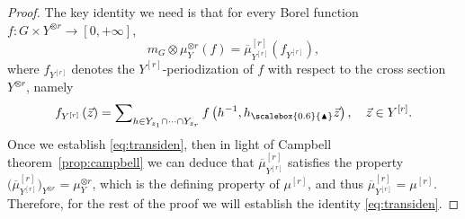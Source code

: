 \documentclass{amsart}
\numberwithin{equation}{subsection}
\theoremstyle{remark}
\newcommand{\diag}{\textsubscript{\raisebox{0.4ex}{\scalebox{0.6}{\(\blacktriangle\)}}}}\xspace
\begin{document}
\begin{proof}
The key identity we need is that for every Borel function \(f:G\times Y^{\otimes r}\to\left[0,+\infty\right]\),
\begin{equation}\label{eq:transiden}
m_{G}\otimes\mu_{Y}^{\otimes r}\left(f\right)=\overline{\mu}_{Y^{\left[r\right]}}^{\left[r\right]}\left(f_{Y^{\left[r\right]}}\right),
\end{equation}
where \(f_{Y^{\left[r\right]}}\) denotes the \(Y^{\left[r\right]}\)-periodization of \(f\) with respect to the cross section \(Y^{\otimes r}\), namely
\[f_{Y^{\left[r\right]}}\left(\vec{z}\right)=\sum\nolimits_{h\in Y_{z_{1}}\cap\dotsm\cap Y_{z_{r}}}f\left(h^{-1},h\diag\vec{z}\right),\quad\vec{z}\in Y^{\left[r\right]}.\]
Once we establish \eqref{eq:transiden}, then in light of Campbell theorem~\ref{prop:campbell} we can deduce that \(\overline{\mu}_{Y^{\left[r\right]}}^{\left[r\right]}\) satisfies the property \(\big(\overline{\mu}_{Y^{\left[r\right]}}^{\left[r\right]}\big)_{Y^{\otimes r}}=\mu_{Y}^{\otimes r}\), which is the defining property of \(\mu^{\left[r\right]}\), and thus \(\overline{\mu}_{Y^{\left[r\right]}}^{\left[r\right]}=\mu^{\left[r\right]}\). Therefore, for the rest of the proof we will establish the identity \eqref{eq:transiden}.


\end{proof}
\end{document}
